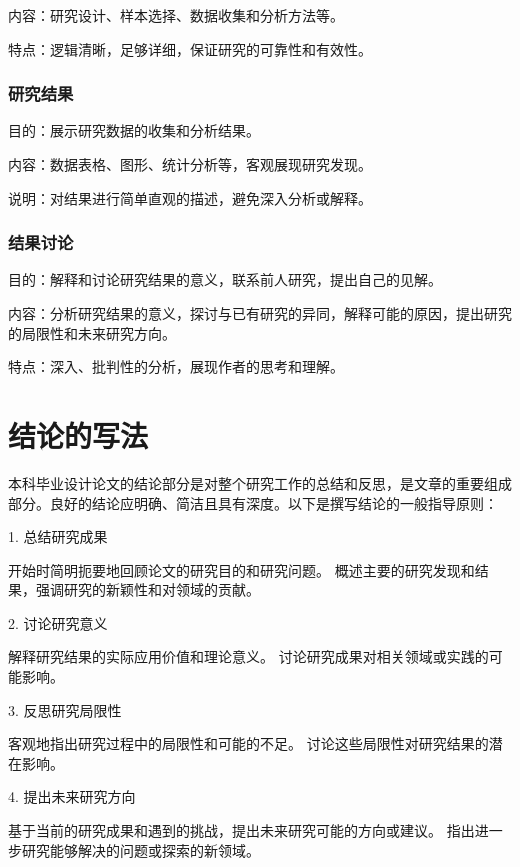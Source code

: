 内容：研究设计、样本选择、数据收集和分析方法等。

特点：逻辑清晰，足够详细，保证研究的可靠性和有效性。

\subsubsection{研究结果}
目的：展示研究数据的收集和分析结果。

内容：数据表格、图形、统计分析等，客观展现研究发现。

说明：对结果进行简单直观的描述，避免深入分析或解释。

\subsubsection{结果讨论}
目的：解释和讨论研究结果的意义，联系前人研究，提出自己的见解。

内容：分析研究结果的意义，探讨与已有研究的异同，解释可能的原因，提出研究的局限性和未来研究方向。

特点：深入、批判性的分析，展现作者的思考和理解。


\section{结论的写法}

本科毕业设计论文的结论部分是对整个研究工作的总结和反思，是文章的重要组成部分。良好的结论应明确、简洁且具有深度。以下是撰写结论的一般指导原则：

1. 总结研究成果

开始时简明扼要地回顾论文的研究目的和研究问题。
概述主要的研究发现和结果，强调研究的新颖性和对领域的贡献。

2. 讨论研究意义

解释研究结果的实际应用价值和理论意义。
讨论研究成果对相关领域或实践的可能影响。

3. 反思研究局限性

客观地指出研究过程中的局限性和可能的不足。
讨论这些局限性对研究结果的潜在影响。

4. 提出未来研究方向

基于当前的研究成果和遇到的挑战，提出未来研究可能的方向或建议。
指出进一步研究能够解决的问题或探索的新领域。


